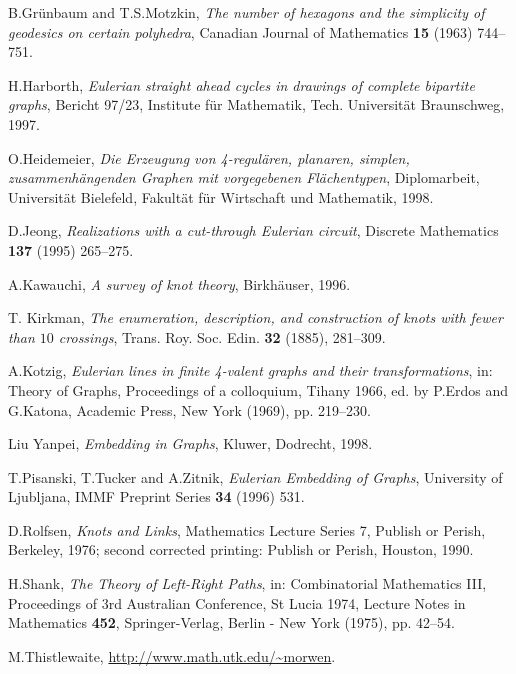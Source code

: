 \documentclass[12pt]{article}
\begin{document}
\begin{thebibliography}{99}
B.Gr\"{u}nbaum and T.S.Motzkin, {\em The number of hexagons and the simplicity
of geodesics on certain polyhedra}, Canadian Journal of Mathematics {\bf 15} (1963) 744--751.


H.Harborth, {\em Eulerian straight ahead cycles in drawings of complete
bipartite graphs}, Bericht 97/23, Institute f\"{u}r Mathematik, Tech. 
Universit\"{a}t
Braunschweg, 1997.


O.Heidemeier, {\em Die Erzeugung von 4-regul\"{a}ren, planaren,
simplen, zusammenh\"{a}ngenden Graphen mit vorgegebenen Fl\"{a}chentypen},
Diplomarbeit, Universit\"{a}t Bielefeld, Fakult\"{a}t f\"{u}r Wirtschaft und
Mathematik, 1998. 


D.Jeong, {\em Realizations with a cut-through Eulerian circuit},
Discrete Mathematics {\bf 137} (1995) 265--275.




A.Kawauchi, {\em A survey of knot theory}, Birkh\"{a}user, 1996.


T. Kirkman, {\em The enumeration, description, and construction of knots with fewer than $10$ crossings}, Trans. Roy. Soc. Edin. {\bf 32} (1885), 281--309.


A.Kotzig, {\em Eulerian lines in finite 4-valent graphs and their 
transformations}, in: Theory of Graphs, Proceedings of a colloquium, 
Tihany 1966, ed. by P.Erdos and G.Katona, Academic Press, 
New York (1969), pp. 219--230.


Liu Yanpei, {\em Embedding in Graphs}, Kluwer, Dodrecht, 1998.


T.Pisanski, T.Tucker and A.Zitnik, {\em Eulerian Embedding of Graphs},
University of Ljubljana, IMMF Preprint Series {\bf 34}
(1996) 531.


D.Rolfsen, {\em Knots and Links}, Mathematics Lecture Series 7, Publish or
Perish, Berkeley, 1976;
second corrected printing: Publish or Perish, Houston, 1990.


H.Shank, {\em The Theory of Left-Right Paths}, in: Combinatorial 
Mathematics III,
Proceedings of 3rd Australian Conference, St Lucia 1974, Lecture Notes in
Mathematics {\bf 452}, Springer-Verlag, Berlin - New York (1975),  pp. 42--54.


M.Thistlewaite, \url{http://www.math.utk.edu/~morwen}.


\end{thebibliography}
\end{document}
